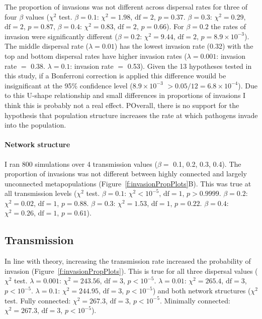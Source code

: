 The proportion of invasions was not different across dispersal rates for three of four $\beta$ values ($\chi^2$ test. $\beta = 0.1$: $\chi^2 = 1.98$, $\text{df} = 2$, $p = 0.37$.  $\beta = 0.3$: $\chi^2 = 0.29$, $\text{df} = 2$, $p = 0.87$, $\beta = 0.4$: $\chi^2 = 0.83$, $\text{df} = 2$, $p = 0.66$).
For $\beta = 0.2$ the rates of invasion were significantly different ($\beta = 0.2$: $\chi^2 = 9.44$, $\text{df} = 2$, $p = \ensuremath{8.9\times 10^{-3}}$).
The middle dispersal rate ($\lambda = 0.01$) has the lowest invasion rate (0.32) with the top and bottom dispersal rates have higher invasion rates ($\lambda = 0.001$: invasion rate $=$ 0.38. $\lambda = 0.1$: invasion rate $=$ 0.53).
Given the 13 hypotheses tested in this study, if a Bonferroni correction is applied this difference wouild be insignificant at the 95\% confidence level (\ensuremath{8.9\times 10^{-3}} $> 0.05 / 12 = 6.8 \times 10^{-4}$).
Due to this U-shape relationship and small differences in proportions of invasions I think this is probably not a real effect.
POverall, there is no support for the hypothesis that population structure increases the rate at which pathogens invade into the population.

\paragraph{Network structure}

I ran 800 simulations over 4 transmission values ($\beta = $ 0.1, 0.2, 0.3, 0.4).
The proportion of invasions was not different between highly connected and largely unconnected metapopulations (Figure~\ref{f:invasionPropPlots}B). 
This was true at all transmission levels ($\chi^2$ test. $\beta = 0.1$: $\chi^2 < 10^{-5}$, $\text{df} = 1$, $p > 0.9999$. $\beta = 0.2$: $\chi^2 = 0.02$, $\text{df} = 1$, $p = 0.88$. $\beta = 0.3$: $\chi^2 = 1.53$, $\text{df} = 1$, $p = 0.22$. $\beta = 0.4$: $\chi^2 = 0.26$, $\text{df} = 1$, $p = 0.61$).

 
\subsection{Transmission}

In line with theory, increasing the transmission rate increased the probability of invasion (Figure~\ref{f:invasionPropPlots}).
This is true for all three dispersal values ($\chi^2$ test. $\lambda = 0.001$: $\chi^2 = 243.56$, $\text{df} = 3$, $p < 10^{-5}$. $\lambda = 0.01$: $\chi^2 = 265.4$, $\text{df} = 3$, $p < 10^{-5}$. $\lambda = 0.1$: $\chi^2 = 244.95$, $\text{df} = 3$, $p < 10^{-5}$) and both network structures ($\chi^2$ test. Fully connected: $\chi^2 = 267.3$, $\text{df} = 3$, $p < 10^{-5}$. Minimally connected: $\chi^2 =  267.3$, $\text{df} = 3$, $p < 10^{-5}$).










